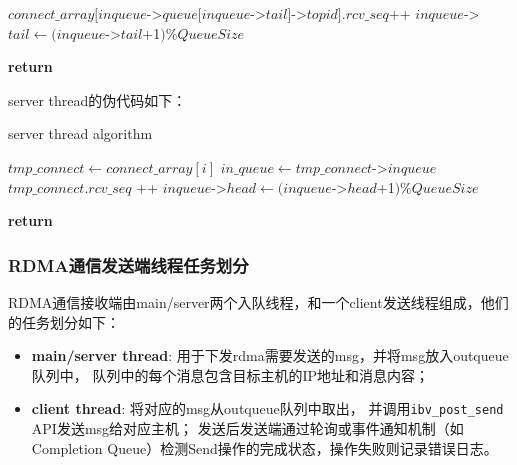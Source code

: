 {\begin{algorithm}
\begin{algorithmic}[1]
            \State
            \State $connect\_array[inqueue$->$queue[inqueue$->$tail]$->$topid].rcv\_seq $++
            \State $inqueue$->$tail \gets (inqueue$->$tail$+1$) \% QueueSize$
            \EndIf
            \EndWhile

            \State
            \State {}
            \State \textbf{return}
            \EndFunction
        \end{algorithmic}
    \end{algorithm}

    \newpage
    server thread的伪代码如下：
    \begin{algorithm}
        \caption{server thread algorithm}
        \begin{algorithmic}[1] %
            \State {}

            \State $tmp\_connect \gets connect\_array[i]$
            \State $in\_queue \gets tmp\_connect$->$inqueue$
            \State {}
            \State {}
            \State {}
            \State $tmp\_connect.rcv\_seq$ ++
            \EndIf
            \State $inqueue$->$head \gets (inqueue$->$head$+1$) \% QueueSize$
            \EndIf
            \EndFor

            \State {}
            \EndIf
            \EndWhile
            \State \textbf{return}
            \EndProcedure
        \end{algorithmic}
    \end{algorithm}

    \newpage
    \subsubsection{RDMA通信发送端线程任务划分}
    RDMA通信接收端由main/server两个入队线程，和一个client发送线程组成，他们的任务划分如下：

    \begin{itemize}[leftmargin=*, nosep]
        \item \textbf{main/server thread}:
              用于下发rdma需要发送的msg，并将msg放入outqueue队列中，
              队列中的每个消息包含目标主机的IP地址和消息内容；
        \item \textbf{client thread}:
              将对应的msg从outqueue队列中取出，
              并调用\texttt{ibv\_post\_send} API发送msg给对应主机；
              发送后发送端通过轮询或事件通知机制（如Completion Queue）检测Send操作的完成状态，操作失败则记录错误日志。
    \end{itemize}

}
